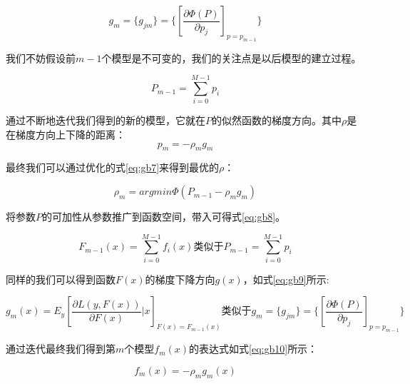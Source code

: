 {\setlength\abovedisplayskip{15pt}
\setlength\belowdisplayskip{15pt}
\begin{equation}
    \label{eq:gb4}
    g_{m}=\{g_{jm}\}=\{[\frac{\partial\Phi(P)}{\partial p_{j}}]_{p=p_{m-1}}\}
\end{equation}}

我们不妨假设前$m-1$个模型是不可变的，我们的关注点是以后模型的建立过程。

{\setlength\abovedisplayskip{15pt}
\setlength\belowdisplayskip{15pt}
\begin{equation}
    \label{eq:gb5}
    P_{m-1}=\sum_{i=0}^{M-1} p_{i}
\end{equation}}

通过不断地迭代我们得到的新的模型，它就在$P$的似然函数的梯度方向。其中$\rho$是在梯度方向上下降的距离：
{\setlength\abovedisplayskip{15pt}
\setlength\belowdisplayskip{15pt}
\begin{equation}
    \label{eq:gb6}
    p_{m}=-\rho_{m}g_{m}
\end{equation}}

最终我们可以通过优化的式\ref{eq:gb7}来得到最优的$\rho$：

{\setlength\abovedisplayskip{15pt}
\setlength\belowdisplayskip{15pt}
\begin{equation}
    \label{eq:gb7}
    \rho_{m}=argmin \Phi(P_{m-1}-\rho_{m}g_{m})
\end{equation}}

将参数$P$的可加性从参数推广到函数空间，带入可得式\ref{eq:gb8}。

{\setlength\abovedisplayskip{15pt}
\setlength\belowdisplayskip{15pt}
\begin{equation}
    \label{eq:gb8}
    F_{m-1}(x)=\sum_{i=0}^{M-1} f_{i}(x) \text{类似于} P_{m-1}=\sum_{i=0}^{M-1} p_{i}
\end{equation}}

同样的我们可以得到函数$F(x)$的梯度下降方向$g(x)$，如式\ref{eq:gb9}所示:

{\setlength\abovedisplayskip{15pt}
\setlength\belowdisplayskip{15pt}
\begin{equation}
    \label{eq:gb9}
    g_{m}(x)=E_{y}[\frac{\partial L(y,F(x))}{\partial F(x)} | x]_{F(x)=F_{m-1}(x)} \text{类似于} g_{m}=\{g_{jm}\}=\{[\frac{\partial\Phi(P)}{\partial p_{j}}]_{p=p_{m-1}}\}
\end{equation}}

通过迭代最终我们得到第$m$个模型$f_{m}(x)$的表达式如式\ref{eq:gb10}所示：

{\setlength\abovedisplayskip{15pt}
\setlength\belowdisplayskip{15pt}
\begin{equation}
    \label{eq:gb10}
    f_{m}(x)=-\rho_{m}g_{m}(x)
\end{equation}}

